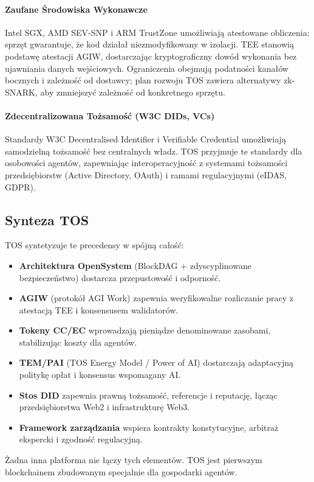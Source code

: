\documentclass[11pt]{article}
\begin{document}
\paragraph{Zaufane Środowiska Wykonawcze} Intel SGX, AMD SEV-SNP i ARM TrustZone umożliwiają atestowane obliczenia: sprzęt gwarantuje, że kod działał niezmodyfikowany w izolacji. TEE stanowią podstawę atestacji AGIW, dostarczając kryptograficzny dowód wykonania bez ujawniania danych wejściowych. Ograniczenia obejmują podatności kanałów bocznych i zależność od dostawcy; plan rozwoju TOS zawiera alternatywy zk-SNARK, aby zmniejszyć zależność od konkretnego sprzętu.

\paragraph{Zdecentralizowana Tożsamość (W3C DIDs, VCs)} Standardy W3C Decentralised Identifier i Verifiable Credential umożliwiają samodzielną tożsamość bez centralnych władz. TOS przyjmuje te standardy dla osobowości agentów, zapewniając interoperacyjność z systemami tożsamości przedsiębiorstw (Active Directory, OAuth) i ramami regulacyjnymi (eIDAS, GDPR).

\subsection{Synteza TOS}
TOS syntetyzuje te precedensy w spójną całość:
\begin{itemize}[noitemsep]
  \item \textbf{Architektura OpenSystem} (BlockDAG + zdyscyplinowane bezpieczeństwo) dostarcza przepustowość i odporność.
  \item \textbf{AGIW} (protokół AGI Work) zapewnia weryfikowalne rozliczanie pracy z atestacją TEE i konsensusem walidatorów.
  \item \textbf{Tokeny CC/EC} wprowadzają pieniądze denominowane zasobami, stabilizując koszty dla agentów.
  \item \textbf{TEM/PAI} (TOS Energy Model / Power of AI) dostarczają adaptacyjną politykę opłat i konsensus wspomagany AI.
  \item \textbf{Stos DID} zapewnia prawną tożsamość, referencje i reputację, łącząc przedsiębiorstwa Web2 i infrastrukturę Web3.
  \item \textbf{Framework zarządzania} wspiera kontrakty konstytucyjne, arbitraż ekspercki i zgodność regulacyjną.
\end{itemize}

Żadna inna platforma nie łączy tych elementów. TOS jest pierwszym blockchainem zbudowanym specjalnie dla gospodarki agentów.
\end{document}
